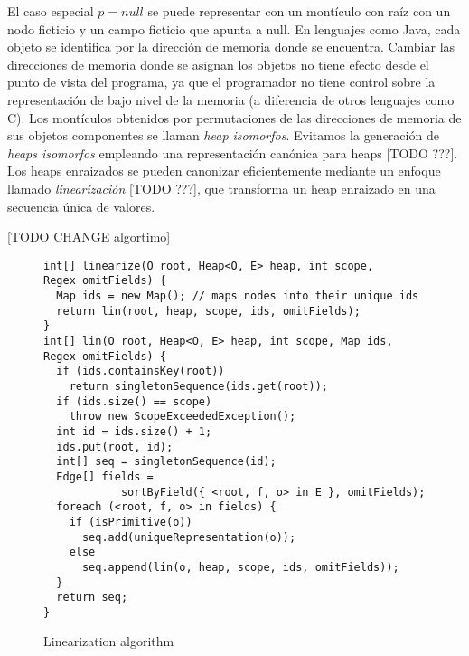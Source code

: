 El caso especial $p=null$  se puede representar con un montículo con raíz con un nodo ficticio y un campo ficticio que apunta a null. En lenguajes como Java, cada objeto se identifica por la dirección de memoria donde se encuentra. Cambiar las direcciones de memoria donde se asignan los objetos no tiene efecto desde el punto de vista del programa, ya que el programador no tiene control sobre la representación de bajo nivel de la memoria (a diferencia de otros lenguajes como C). Los montículos obtenidos por permutaciones de las direcciones de memoria de sus objetos componentes se llaman \emph{heap isomorfos}. Evitamos la generación de \emph{heaps isomorfos} empleando una representación canónica para heaps [TODO ???]. Los heaps enraizados se pueden canonizar eficientemente mediante un enfoque llamado \emph{linearización} [TODO ???], que transforma un heap enraizado en una secuencia única de valores. 


[TODO CHANGE algortimo]
\bigbreak

\begin{figure}[!th]
\begin{lstlisting}
int[] linearize(O root, Heap<O, E> heap, int scope, 
Regex omitFields) {
  Map ids = new Map(); // maps nodes into their unique ids 
  return lin(root, heap, scope, ids, omitFields); 
}
int[] lin(O root, Heap<O, E> heap, int scope, Map ids, 
Regex omitFields) { 
  if (ids.containsKey(root))
    return singletonSequence(ids.get(root)); 
  if (ids.size() == scope) 
    throw new ScopeExceededException();
  int id = ids.size() + 1;
  ids.put(root, id);
  int[] seq = singletonSequence(id);
  Edge[] fields = 
            sortByField({ <root, f, o> in E }, omitFields); 
  foreach (<root, f, o> in fields) {
    if (isPrimitive(o)) 
      seq.add(uniqueRepresentation(o));
    else
      seq.append(lin(o, heap, scope, ids, omitFields));
  }
  return seq; 
}
\end{lstlisting}
\caption{Linearization algorithm}
\label{alg:linearization}
\end{figure}



